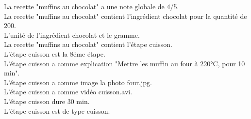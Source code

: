 \documentclass[a4paper,10pt]{article}
\begin{document}
La recette "muffins au chocolat" a une note globale de 4/5.\\
La recette "muffins au chocolat" contient l'ingrédient chocolat pour la quantité de 200.\\
L'unité de l'ingrédient chocolat et le gramme.\\
La recette "muffins au chocolat" contient l'étape cuisson.\\
L'étape cuisson est la 8éme étape.\\
L'étape cuisson a comme explication "Mettre les muffin au four à 220°C, pour 10 min".\\
L'étape cuisson a comme image la photo four.jpg.\\
L'étape cuisson a comme vidéo cuisson.avi.\\
L'étape cuisson dure 30 min.\\
L'étape cuisson est de type cuisson.\\
\end{document}

